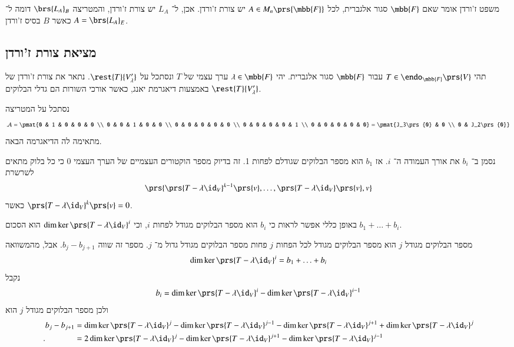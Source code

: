 \documentclass[a4paper,10pt,oneside,openany]{article}
\begin{document}
\begin{remark}
משפט ז'ורדן אומר שאם
$\mbb{F}$
סגור אלגברית, לכל
$A \in M_n\prs{\mbb{F}}$
יש צורת ז'ורדן. אכן, ל־%
$L_A$
יש צורת ז'ורדן, והמטריצה
$\brs{L_A}_B$
דומה ל־%
$A = \brs{L_A}_E$
כאשר
$B$
בסיס ז'ורדן.
\end{remark}

\subsection{מציאת צורת ז'ורדן}

תהי
$T \in \endo_{\mbb{F}}\prs{V}$
עבור
$\mbb{F}$
סגור אלגברית.
יהי
$\lambda \in \mbb{F}$
ערך עצמי של
$T$
ונסתכל על
$\rest{T}{V_{\lambda}'}$.
נתאר את צורת ז'ורדן של
$\rest{T}{V_{\lambda}'}$
באמצעות דיאגרמת יאנג, כאשר אורכי השורות הם גדלי הבלוקים.

\begin{example}
נסתכל על המטריצה
\begin{align*}
\text{.} A = \pmat{0 & 1 & 0 & 0 & 0 \\ 0 & 0 & 1 & 0 & 0 \\ 0 & 0 & 0 & 0 & 0 \\ 0 & 0 & 0 & 0 & 1 \\ 0 & 0 & 0 & 0 & 0} = \pmat{J_3\prs{0} & 0 \\ 0 & J_2\prs{0}}
\end{align*}
מתאימה לה הדיאגרמה הבאה.

\begin{center}
\begin{english}
\end{english}
\end{center}
\end{example}

נסמן ב־%
$b_i$
את אורך העמודה ה־%
$i$.
אז
$b_1$
הוא מספר הבלוקים שגודלם לפחות 1. זה בדיוק מספר הוקטורים העצמיים של הערך העצמי
$0$
כי כל בלוק מתאים לשרשרת
\[\prs{\prs{T-\lambda \id_V}^{k-1}\prs{v} , \ldots, \prs{T-\lambda \id_V}\prs{v}, v}\]
כאשר
$\prs{T - \lambda \id_V}^k\prs{v} = 0$.

באופן כללי אפשר לראות כי
$b_i$
הוא מספר הבלוקים מגודל לפחות
$i$,
וכי
$\dim\ker\prs{T-\lambda \id_V}^i$
הוא הסכום
$b_1 + \ldots + b_i$.

מספר הבלוקים מגודל
$j$
הוא מספר הבלוקים מגודל לכל הפחות
$j$
פחות מספר הבלוקים מגודל גדול מ־%
$j$.
מספר זה שווה
$b_j - b_{j+1}$.
אבל, מהמשוואה
\[\dim\ker\prs{T-\lambda \id_V}^i = b_1 + \ldots + b_i\]
נקבל
\[b_i = \dim\ker\prs{T-\lambda \id_V}^i - \dim\ker\prs{T-\lambda \id_V}^{i-1}\]
ולכן מספר הבלוקים מגודל
$j$
הוא
\begin{align*}
b_j - b_{j+1} &= \dim \ker\prs{T - \lambda \id_V}^j - \dim\ker\prs{T-\lambda \id_V}^{j-1} - \dim\ker\prs{T-\lambda \id_V}^{j+1} + \dim\ker\prs{T-\lambda \id_V}^{j}
\\\text{.} \hphantom{b_j - b_{j+1}} &= 2\dim \ker\prs{T - \lambda \id_V}^j - \dim\ker\prs{T-\lambda \id_V}^{j+1} - \dim\ker\prs{T-\lambda \id_V}^{j-1}
\end{align*}
\end{document}
